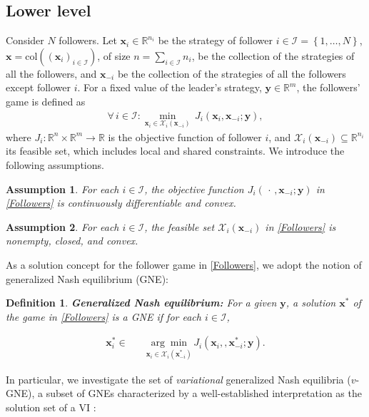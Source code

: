 \documentclass[letterpaper, 10 pt, conference]{ieeeconf}
\newcommand{\real}{\mathbb{R}}
\newcommand\xbf{\mathbf{x}}
\newcommand\ybf{\mathbf{y}}
\newtheorem{definition}{Definition}
\newtheorem{assumption}{Assumption}
\begin{document}
\subsection{Lower level}
Consider $N$ followers. Let $\xbf_i \in \real^{n_i}$ be the strategy of follower $i \in \mathcal{I}= \left\{1, \dots, N\right\}$, $\xbf=\mathrm{col}\left ((\xbf_i)_{i \in \mathcal{I}}\right)$, of size $n=\sum_{i \in \mathcal{I}}n_i$, be the collection of the strategies of all the followers, and $\xbf_{-i}$ be the collection of the strategies of all the followers except follower $i$. For a fixed value of the leader's strategy, $\ybf \in \real^m$, the followers' game is defined as 
\begin{align}\label{Followers}
\forall \,i \in \mathcal{I}: \underset{\xbf_i \in \mathcal{X}_i(\xbf_{-i})} {\min} \, J_i(\xbf_i, \xbf_{-i}; \ybf),
\end{align}
where $J_i:\real^{n}\times\real^m \rightarrow \real$ is the objective function of follower $i$, and $\mathcal{X}_i(\xbf_{-i}) \subseteq\real^{n_i}$ its feasible set, which includes local and shared constraints. We introduce the following assumptions. 
\begin{assumption}\label{Ass1}
    For each $i\in \mathcal{I}$, the objective function $J_i(\, \cdot \,,\xbf_{-i};\ybf)$ in \eqref{Followers} is continuously differentiable and convex.
\end{assumption}
\begin{assumption}\label{Ass2}
    For each $i\in\mathcal{I}$, the feasible set $\mathcal{X}_i(\xbf_{-i})$ in \eqref{Followers} is nonempty, closed, and convex. 
\end{assumption}
As a solution concept for the follower game in \eqref{Followers}, we adopt the notion of generalized Nash equilibrium (GNE):
\begin{definition}{\textbf{Generalized Nash equilibrium:}}
   For a given $\ybf$, a solution $\xbf^*$ of the game in \eqref{Followers} is a GNE if for each $i \in \mathcal{I}$,

\begin{align}
      \xbf^*_i \in \quad &\underset{\xbf_i\in \mathcal{X}_i(\xbf^*_{-i})} {\arg \min} \, J_i(\xbf_i, , \xbf^*_{-i}; \ybf).
\end{align}
\end{definition}
In particular, we investigate the set of \emph{variational} generalized Nash equilibria ($v$-GNE), a subset of GNEs characterized by a well-established interpretation as the solution set of a VI \cite{facchinei2003finite}:
\end{document}
